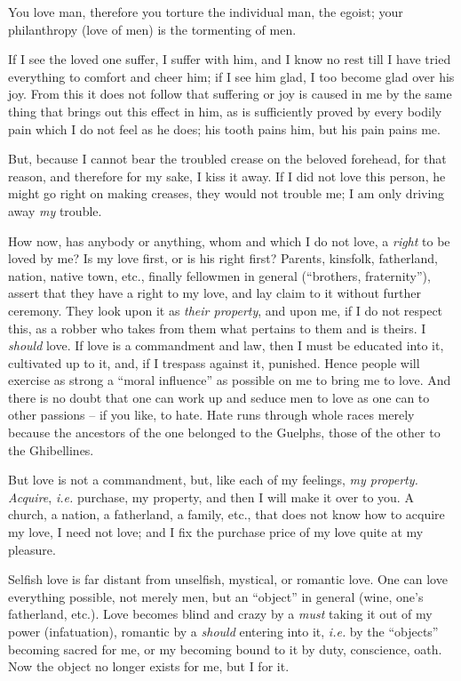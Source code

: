 \documentclass[12pt,a4paper]{book}
\begin{document}
You love man, therefore you torture the individual man, the egoist; your 
philanthropy (love of men) is the tormenting of men.

If I see the loved one suffer, I suffer with him, and I know no rest till I 
have tried everything to comfort and cheer him; if I see him glad, I too 
become glad over his joy. From this it does not follow that suffering or joy 
is caused in me by the same thing that brings out this effect in him, as is 
sufficiently proved by every bodily pain which I do not feel as he does; his 
tooth pains him, but his pain pains me.

But, because I cannot bear the troubled crease on the beloved forehead, for 
that reason, and therefore for my sake, I kiss it away. If I did not love this 
person, he might go right on making creases, they would not trouble me; I am 
only driving away \textit{my} trouble.

How now, has anybody or anything, whom and which I do not love, a 
\textit{right} to be loved by me? Is my love first, or is his right first? 
Parents, kinsfolk, fatherland, nation, native town, etc., finally fellowmen in 
general (``brothers, fraternity''), assert that they have a right to my 
love, and lay claim to it without further ceremony. They look upon it as 
\textit{their property}, and upon me, if I do not respect this, as a robber 
who takes from them what pertains to them and is theirs. I \textit{should} 
love. If love is a commandment and law, then I must be educated into it, 
cultivated up to it, and, if I trespass against it, punished. Hence people 
will exercise as strong a ``moral influence'' as possible on me to bring me 
to love. And there is no doubt that one can work up and seduce men to love as 
one can to other passions -- if you like, to hate. Hate runs through whole 
races merely because the ancestors of the one belonged to the Guelphs, those 
of the other to the Ghibellines.

But love is not a commandment, but, like each of my feelings, \textit{my 
property. Acquire}, \textit{i.e.} purchase, my property, and then I will make 
it over to you. A church, a nation, a fatherland, a family, etc., that does 
not know how to acquire my love, I need not love; and I fix the purchase price 
of my love quite at my pleasure.

Selfish love is far distant from unselfish, mystical, or romantic love. One 
can love everything possible, not merely men, but an ``object'' in general 
(wine, one's fatherland, etc.). Love becomes blind and crazy by a 
\textit{must} taking it out of my power (infatuation), romantic by a 
\textit{should} entering into it, \textit{i.e.} by the ``objects'' becoming 
sacred for me, or my becoming bound to it by duty, conscience, oath. Now the 
object no longer exists for me, but I for it.
\end{document}
